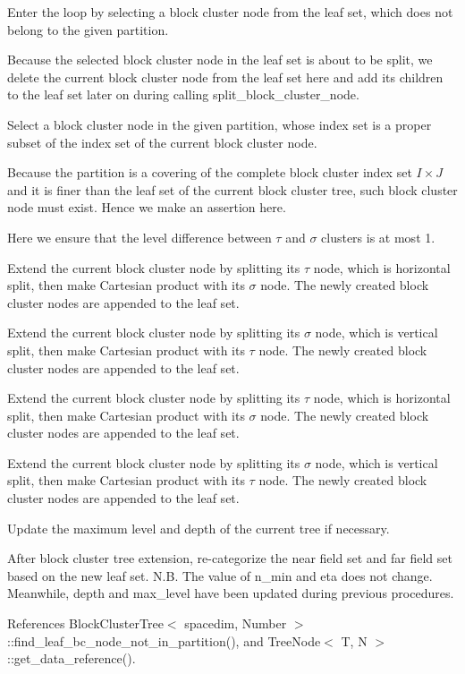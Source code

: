 Enter the loop by selecting a block cluster node from the leaf set, which does not belong to the given partition.

Because the selected block cluster node in the leaf set is about to be split, we delete the current block cluster node from the leaf set here and add its children to the leaf set later on during calling {\ttfamily split\+\_\+block\+\_\+cluster\+\_\+node}.

Select a block cluster node in the given partition, whose index set is a proper subset of the index set of the current block cluster node.

Because the partition is a covering of the complete block cluster index set $I \times J$ and it is finer than the leaf set of the current block cluster tree, such block cluster node must exist. Hence we make an assertion here.

Here we ensure that the level difference between $\tau$ and $\sigma$ clusters is at most 1.

Extend the current block cluster node by splitting its $\tau$ node, which is horizontal split, then make Cartesian product with its $\sigma$ node. The newly created block cluster nodes are appended to the leaf set.

Extend the current block cluster node by splitting its $\sigma$ node, which is vertical split, then make Cartesian product with its $\tau$ node. The newly created block cluster nodes are appended to the leaf set.

Extend the current block cluster node by splitting its $\tau$ node, which is horizontal split, then make Cartesian product with its $\sigma$ node. The newly created block cluster nodes are appended to the leaf set.

Extend the current block cluster node by splitting its $\sigma$ node, which is vertical split, then make Cartesian product with its $\tau$ node. The newly created block cluster nodes are appended to the leaf set.

Update the maximum level and depth of the current tree if necessary.

After block cluster tree extension, re-\/categorize the near field set and far field set based on the new leaf set. N.\+B. The value of {\ttfamily n\+\_\+min} and {\ttfamily eta} does not change. Meanwhile, {\ttfamily depth} and {\ttfamily max\+\_\+level} have been updated during previous procedures.

References Block\+Cluster\+Tree$<$ spacedim, Number $>$\+::find\+\_\+leaf\+\_\+bc\+\_\+node\+\_\+not\+\_\+in\+\_\+partition(), and Tree\+Node$<$ T, N $>$\+::get\+\_\+data\+\_\+reference().



